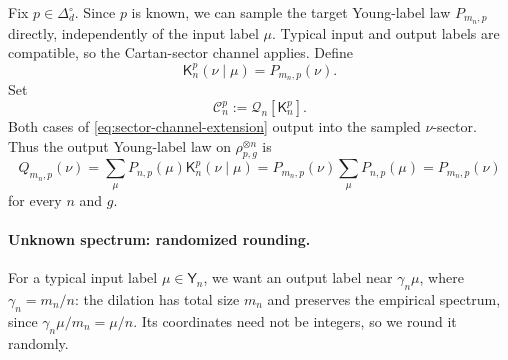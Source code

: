 \documentclass[11pt]{article}
\theoremstyle{remark}
\theoremstyle{plain}
\newcommand{\cC}{\mathcal C}
\newcommand{\ot}{\otimes}
\begin{document}
Fix \(p\in\Delta_d^\circ\).  Since \(p\) is known, we can sample the target
Young-label law \(P_{m_n,p}\) directly, independently of the input label
\(\mu\).  Typical input and output labels are compatible, so the
Cartan-sector channel applies.
Define
\begin{equation}\label{eq:known-target-label-kernel}
  \mathsf K_n^p(\nu\mid\mu)=P_{m_n,p}(\nu).
\end{equation}
Set
\begin{equation}\label{eq:known-cloner-definition}
  \cC_n^p:=\mathcal Q_n[\mathsf K_n^p].
\end{equation}
Both cases of \eqref{eq:sector-channel-extension} output into the sampled
\(\nu\)-sector.  Thus the output Young-label law on
\(\rho_{p,g}^{\ot n}\) is
\[
  Q_{m_n,p}(\nu)
  =\sum_\mu P_{n,p}(\mu)\mathsf K_n^p(\nu\mid\mu)
  =P_{m_n,p}(\nu)\sum_\mu P_{n,p}(\mu)
  =P_{m_n,p}(\nu)
\]
for every \(n\) and \(g\).

\paragraph{Unknown spectrum: randomized rounding.}

For a typical input label \(\mu\in\mathsf Y_n\), we want an output label
near \(\gamma_n\mu\), where \(\gamma_n=m_n/n\): the dilation has total size
\(m_n\) and preserves the empirical spectrum, since
\(\gamma_n\mu/m_n=\mu/n\).  Its coordinates need not be integers, so we
round it randomly.
\end{document}
